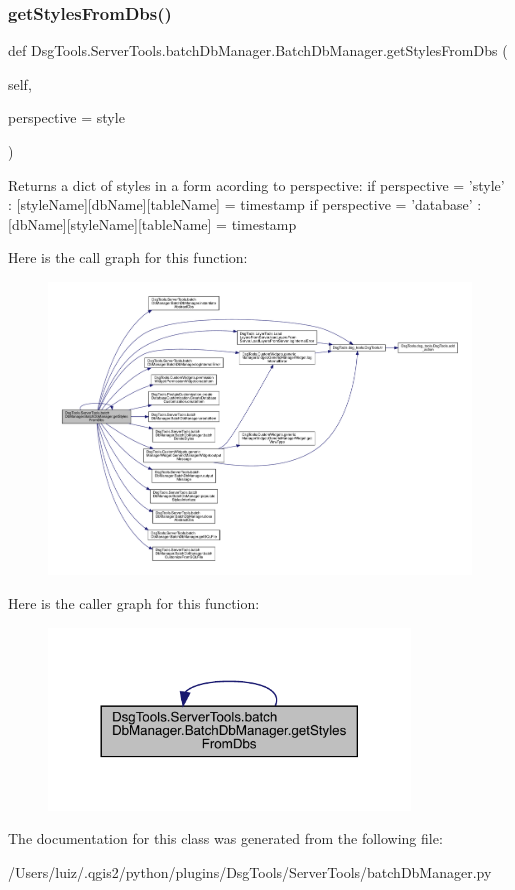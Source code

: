 \subsubsection{\texorpdfstring{get\+Styles\+From\+Dbs()}{getStylesFromDbs()}}
{\footnotesize\ttfamily def Dsg\+Tools.\+Server\+Tools.\+batch\+Db\+Manager.\+Batch\+Db\+Manager.\+get\+Styles\+From\+Dbs (\begin{DoxyParamCaption}\item[{}]{self,  }\item[{}]{perspective = {\ttfamily \textquotesingle{}style\textquotesingle{}} }\end{DoxyParamCaption})}

\begin{DoxyVerb}Returns a dict of styles in a form acording to perspective:
    if perspective = 'style'    : [styleName][dbName][tableName] = timestamp
    if perspective = 'database' : [dbName][styleName][tableName] = timestamp 
\end{DoxyVerb}
 Here is the call graph for this function\+:
\nopagebreak
\begin{figure}[H]
\begin{center}
\leavevmode
\includegraphics[width=350pt]{class_dsg_tools_1_1_server_tools_1_1batch_db_manager_1_1_batch_db_manager_afbadd0ed272194f152f55ae6923603cf_cgraph}
\end{center}
\end{figure}
Here is the caller graph for this function\+:
\nopagebreak
\begin{figure}[H]
\begin{center}
\leavevmode
\includegraphics[width=272pt]{class_dsg_tools_1_1_server_tools_1_1batch_db_manager_1_1_batch_db_manager_afbadd0ed272194f152f55ae6923603cf_icgraph}
\end{center}
\end{figure}


The documentation for this class was generated from the following file\+:\begin{DoxyCompactItemize}
\item 
/\+Users/luiz/.\+qgis2/python/plugins/\+Dsg\+Tools/\+Server\+Tools/batch\+Db\+Manager.\+py\end{DoxyCompactItemize}
